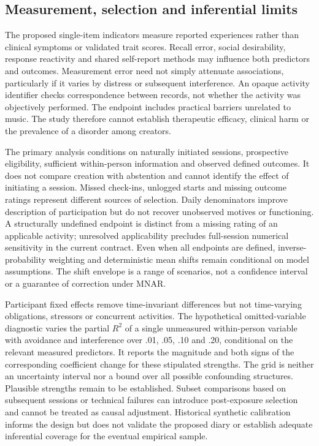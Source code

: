 \documentclass[11pt]{article}
\begin{document}
\subsection{Measurement, selection and inferential limits}
The proposed single-item indicators measure reported experiences rather than clinical symptoms or validated trait scores. Recall error, social desirability, response reactivity and shared self-report methods may influence both predictors and outcomes. Measurement error need not simply attenuate associations, particularly if it varies by distress or subsequent interference. An opaque activity identifier checks correspondence between records, not whether the activity was objectively performed. The endpoint includes practical barriers unrelated to music. The study therefore cannot establish therapeutic efficacy, clinical harm or the prevalence of a disorder among creators.

The primary analysis conditions on naturally initiated sessions, prospective eligibility, sufficient within-person information and observed defined outcomes. It does not compare creation with abstention and cannot identify the effect of initiating a session. Missed check-ins, unlogged starts and missing outcome ratings represent different sources of selection. Daily denominators improve description of participation but do not recover unobserved motives or functioning. A structurally undefined endpoint is distinct from a missing rating of an applicable activity; unresolved applicability precludes full-session numerical sensitivity in the current contract. Even when all endpoints are defined, inverse-probability weighting and deterministic mean shifts remain conditional on model assumptions. The shift envelope is a range of scenarios, not a confidence interval or a guarantee of correction under MNAR.

Participant fixed effects remove time-invariant differences but not time-varying obligations, stressors or concurrent activities. The hypothetical omitted-variable diagnostic varies the partial $R^2$ of a single unmeasured within-person variable with avoidance and interference over .01, .05, .10 and .20, conditional on the relevant measured predictors. It reports the magnitude and both signs of the corresponding coefficient change for these stipulated strengths. The grid is neither an uncertainty interval nor a bound over all possible confounding structures. Plausible strengths remain to be established. Subset comparisons based on subsequent sessions or technical failures can introduce post-exposure selection and cannot be treated as causal adjustment. Historical synthetic calibration informs the design but does not validate the proposed diary or establish adequate inferential coverage for the eventual empirical sample.
\end{document}
